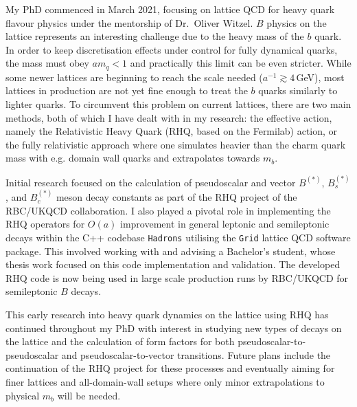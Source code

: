 \documentclass[11pt, a4paper]{awesome-cv}
\begin{document}
\begin{cvletter}
My PhD commenced in March 2021, focusing on lattice QCD for heavy quark flavour physics under the mentorship of Dr.~Oliver Witzel. 
$B$ physics on the lattice represents an interesting challenge due to the heavy mass of the $b$ quark.
In order to keep discretisation effects under control for fully dynamical quarks, the mass must obey $am_q<1$ and practically this limit can be even stricter. 
While some newer lattices are beginning to reach the scale needed ($a^{-1}\gtrsim4\,$GeV), most lattices in production are not yet fine enough to treat the $b$ quarks similarly to lighter quarks. 
To circumvent this problem on current lattices, there are two main methods, both of which I have dealt with in my research: the effective action, namely the Relativistic Heavy Quark (RHQ, based on the Fermilab) action, or the fully relativistic approach where one simulates heavier than the charm quark mass with e.g. domain wall quarks and extrapolates towards $m_b$.

Initial research focused on the calculation of pseudoscalar and vector $B^{(*)}$, $B_s^{(*)}$, and $B_c^{(*)}$ meson decay constants as part of the RHQ project of the RBC/UKQCD collaboration. 
I also played a pivotal role in implementing the RHQ operators for $O(a)$ improvement in general leptonic and semileptonic decays within the C++ codebase {\tt Hadrons} utilising the {\tt Grid} lattice QCD software package. 
This involved working with and advising a Bachelor's student, whose thesis work focused on this code implementation and validation.
The developed RHQ code is now being used in large scale production runs by RBC/UKQCD for semileptonic $B$ decays.

This early research into heavy quark dynamics on the lattice using RHQ has continued throughout my PhD with interest in studying new types of decays on the lattice and the calculation of form factors for both pseudoscalar-to-pseudoscalar and pseudoscalar-to-vector transitions.
Future plans include the continuation of the RHQ project for these processes and eventually aiming for finer lattices and all-domain-wall setups where only minor extrapolations to physical $m_b$ will be needed.


\end{cvletter}
\end{document}
